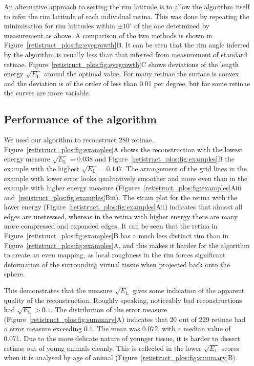 \documentclass[10pt]{article}
\begin{document}
An alternative approach to setting the rim latitude is to allow the
algorithm itself to infer the rim latitude of each individual
retina. This was done by repeating the minimisation for rim latitudes
within $\pm10^\circ$ of the one determined by measurement as above. A
comparison of the two methods is shown in
Figure~\ref{retistruct_plos:fig:eyegrowth}B. It can be seen that the
rim angle inferred by the algorithm is usually less than that inferred
from measurement of standard retinae.
Figure~\ref{retistruct_plos:fig:eyegrowth}C shows deviations of the
length energy $\sqrt{E_{\mathrm{L}}}$ around the optimal value. For many
retinae the surface is convex and the deviation is of the order of
less than 0.01 per degree, but for some retinae the curves are more
variable.

\subsection*{Performance of the algorithm}
\label{retistruct_plos:sec:perf-algor}

We used our algorithm to reconstruct 280 retinae. 
Figure~\ref{retistruct_plos:fig:examples}A shows the reconstruction
with the lowest energy measure $\sqrt{E_{\mathrm{L}}}=0.038$ and
Figure~\ref{retistruct_plos:fig:examples}B the example with the
highest $\sqrt{E_{\mathrm{L}}}=0.147$. The arrangement of the grid lines
in the example with lower error looks qualitatively smoother and more
even than in the example with higher energy measure
(Figures~\ref{retistruct_plos:fig:examples}Aiii
and~\ref{retistruct_plos:fig:examples}Biii). The strain plot for the
retina with the lower energy
(Figure~\ref{retistruct_plos:fig:examples}Aii) indicates that almost
all edges are unstressed, whereas in the retina with higher energy
there are many more compressed and expanded edges. It can be seen that
the retina in Figure~\ref{retistruct_plos:fig:examples}B has a much
less distinct rim than in Figure~\ref{retistruct_plos:fig:examples}A,
and this makes it harder for the algorithm to create an even mapping,
as local roughness in the rim forces significant deformation of the
surrounding virtual tissue when projected back onto the sphere.

This demonstrates that the measure $\sqrt{E_{\mathrm{L}}}$ gives some
indication of the apparent quality of the reconstruction. Roughly
speaking, noticeably bad reconstructions had
$\sqrt{E_{\mathrm{L}}}>0.1$. The distribution of the error measure
(Figure~\ref{retistruct_plos:fig:summary}A) indicates that 20 out of
229 retinae had a error measure exceeding 0.1. The mean was 0.072,
with a median value of 0.071. Due to the more delicate nature of
younger tissue, it is harder to dissect retinae out of young animals
cleanly. This is reflected in the lower $\sqrt{E_{\mathrm{L}}}$ scores
when it is analysed by age of animal
(Figure~\ref{retistruct_plos:fig:summary}B).
\end{document}
